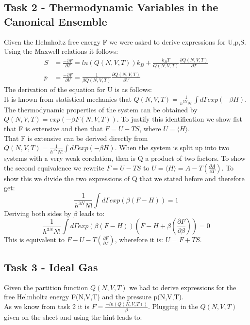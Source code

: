 \documentclass[12pt,a4paper]{scrartcl}
\begin{document}
\newpage
\subsection{Task 2 - Thermodynamic Variables in the Canonical Ensemble}
Given the Helmholtz free energy F we were asked to derive expressions for U,p,S.
Using the Maxwell relations it follows:\\
\begin{align}
S&=\frac{-\partial F}{\partial T} = ln(Q(N,V,T))k_B+\frac{k_BT}{Q(N,V,T)}\frac{\partial Q(N,V,T)}{\partial T}\nonumber\\
p&=\frac{-\partial F}{\partial V}=\frac{1}{\beta Q(N,V,T)}\frac{\partial Q(N,V,T)}{\partial V}\nonumber
\end{align}
The derivation of the equation for U is as follows:\\
It is known from statistical mechanics that $Q(N,V,T)= \frac{1}{h^{3N}N!}\int d\Gamma exp(-\beta H)$. The thermodynamic properties of the system can be obtained by $Q(N,V,T)=exp(-\beta F(N,V,T))$. To justify this identification we show fist that F is extensive and then that $F=U-TS$, where $U=\langle H \rangle$.\\
That F is extensive can be derived directly from $Q(N,V,T)= \frac{1}{h^{3N}N!}\int d\Gamma exp(-\beta H)$. When the system is split up into two systems with a very weak corelation, then is Q a product of two factors.
To show the second equivalence we rewrite $F = U -TS $ to $U = \langle H \rangle = A - T\left(\frac{\partial A}{\partial T} \right)$.
To show this we divide the two expressions of Q that we stated before and therefore get:\\
\[\frac{1}{h^{3N}N!}\int d\Gamma exp(\beta (F-H))=1\]
Deriving both sides by $\beta$ leads to:\\
\[ \frac{1}{h^{3N}N!}\int d\Gamma exp(\beta (F-H))(F-H+\beta \left(\frac{\partial F}{\partial \beta}\right))=0\]
This is equivalent to $F - U - T \left(\frac{\partial F}{\partial T}\right)$, wherefore it is: $U= F+TS$.

\subsection{Task 3 - Ideal Gas}
Given the partition function $Q(N,V,T)$ we had to derive expressions for the free Helmholtz energy F(N,V,T) and the pressure p(N,V,T).\\
As we know from task 2 it is $F=\frac{-ln(Q(N,V,T))}{\beta}$.
Plugging in the $Q(N,V,T)$ given on the sheet and using the hint leads to:
\end{document}
